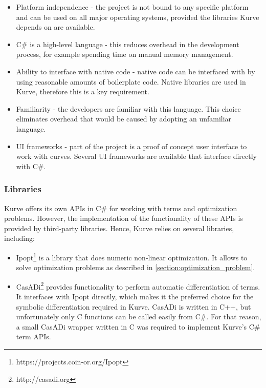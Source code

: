 \documentclass[a4paper]{article}
\begin{document}
				\begin{itemize}
				  	\item Platform independence - the project is not bound to any specific platform and can be used on all major operating systems, provided the libraries Kurve depends on are available. 
				  	\item C\# is a high-level language - this reduces overhead in the development process, for example spending time on manual memory management.
					\item Ability to interface with native code - native code can be interfaced with by using reasonable amounts of boilerplate code. Native libraries are used in Kurve, therefore this is a key requirement.
					\item Familiarity - the developers are familiar with this language. This choice eliminates overhead that would be caused by adopting an unfamiliar language.
					\item UI frameworks - part of the project is a proof of concept user interface to work with curves. Several UI frameworks are available that interface directly with C\#.
				\end{itemize}
			
			\subsubsection{Libraries}
				
				Kurve offers its own APIs in C\# for working with terms and optimization problems. However, the implementation of the functionality of these APIs is provided by third-party libraries. Hence, Kurve relies on several libraries, including:
				
				\begin{itemize}
				  	\item Ipopt\footnote{https://projects.coin-or.org/Ipopt} is a library that does numeric non-linear optimization. It allows to solve optimization problems as described in \ref{section:optimization_problem}.
					\item CasADi\footnote{http://casadi.org} provides functionality to perform automatic differentiation of terms. It interfaces with Ipopt directly, which makes it the preferred choice for the symbolic differentiation required in Kurve. CasADi is written in C++, but unfortunately only C functions can be called easily from C\#. For that reason, a small CasADi wrapper written in C was required to implement Kurve's C\# term APIs. 
				\end{itemize}
			
\end{document}
